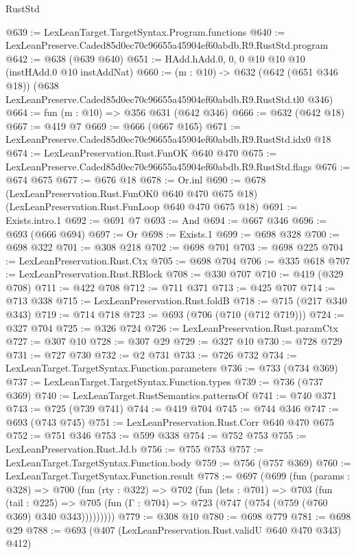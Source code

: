 \begin{lexlean}{RustStd}
\begin{coremodule}
@639 := LexLeanTarget.TargetSyntax.Program.functions
@640 := LexLeanPreserve.Caded85d0ec70c96655a45904ef60abdb.R9.RustStd.program
@642 := @638 (@639 @640)
@651 := HAdd.hAdd.{0, 0, 0} @10 @10 @10 (instHAdd.{0} @10 instAddNat)
@660 := (m : @10) ->
  @632
    (@642 (@651 @346 @18))
    (@638 LexLeanPreserve.Caded85d0ec70c96655a45904ef60abdb.R9.RustStd.tl0 @346)
@664 := fun (m : @10) => @356 @631 (@642 @346)
@666 := @632 (@642 @18)
@667 := @419 @7
@669 := @666 (@667 @165)
@671 := LexLeanPreserve.Caded85d0ec70c96655a45904ef60abdb.R9.RustStd.idx0 @18
@674 := LexLeanPreservation.Rust.FunOK @640 @470
@675 := LexLeanPreserve.Caded85d0ec70c96655a45904ef60abdb.R9.RustStd.flags
@676 := @674 @675
@677 := @676 @18
@678 := Or.inl
@690 := @678
    (LexLeanPreservation.Rust.FunOK0 @640 @470 @675 @18)
    (LexLeanPreservation.Rust.FunLoop @640 @470 @675 @18)
@691 := Exists.intro.{1}
@692 := @691 @7
@693 := And
@694 := @667 @346
@696 := @693 (@666 @694)
@697 := Or
@698 := Exists.{1}
@699 := @698 @328
@700 := @698 @322
@701 := @308 @218
@702 := @698 @701
@703 := @698 @225
@704 := LexLeanPreservation.Rust.Ctx
@705 := @698 @704
@706 := @335 @618
@707 := LexLeanPreservation.Rust.RBlock
@708 := @330 @707
@710 := @419 (@329 @708)
@711 := @422 @708
@712 := @711 @371
@713 := @425 @707
@714 := @713 @338
@715 := LexLeanPreservation.Rust.foldB
@718 := @715 (@217 @340 @343)
@719 := @714 @718
@723 := @693 (@706 (@710 (@712 @719)))
@724 := @327 @704
@725 := @326 @724
@726 := LexLeanPreservation.Rust.paramCtx
@727 := @307 @10
@728 := @307 @29
@729 := @327 @10
@730 := @728 @729
@731 := @727 @730
@732 := @2 @731
@733 := @726 @732
@734 := LexLeanTarget.TargetSyntax.Function.parameters
@736 := @733 (@734 @369)
@737 := LexLeanTarget.TargetSyntax.Function.types
@739 := @736 (@737 @369)
@740 := LexLeanTarget.RustSemantics.patternsOf
@741 := @740 @371
@743 := @725 (@739 @741)
@744 := @419 @704
@745 := @744 @346
@747 := @693 (@743 @745)
@751 := LexLeanPreservation.Rust.Corr @640 @470 @675
@752 := @751 @346
@753 := @599 @338
@754 := @752 @753
@755 := LexLeanPreservation.Rust.Jd.b
@756 := @755 @753
@757 := LexLeanTarget.TargetSyntax.Function.body
@759 := @756 (@757 @369)
@760 := LexLeanTarget.TargetSyntax.Function.result
@778 := @697
    (@699
      (fun (params : @328) =>
      @700
        (fun (rty : @322) =>
        @702
          (fun (lets : @701) =>
          @703
            (fun (tail : @225) =>
            @705 (fun (Γ : @704) => @723 (@747 (@754 (@759 (@760 @369) @340 @343)))))))))
@779 := @308 @10
@780 := @698 @779
@781 := @698 @29
@788 := @693 (@407 (LexLeanPreservation.Rust.validU @640 @470 @343) @412)

\end{coremodule}
\end{lexlean}
